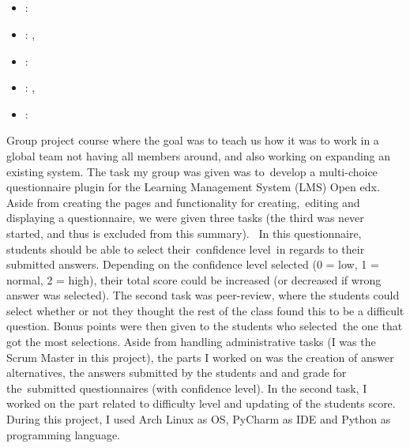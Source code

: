 \label{sec:section5}

\subsection[Global Software Development]{}
\label{sec:glob_soft_dev}
\begin{itemize} 
	\item {}: 
	\item {}: , 
	\item {}: 
	\item {}: , 
	\item {}: 
\end{itemize} 
Group project course where the goal was to teach us how it was to work in a global team not having all members around, and also working on expanding an existing system. 
The task my group was given was to develop a multi-choice questionnaire plugin for the Learning Management System (LMS) Open edx. 
\vspace{0.5em}\newline
Aside from creating the pages and functionality for creating, editing and displaying a questionnaire, we were given three tasks 
(the third was never started, and thus is excluded from this summary). 
In this questionnaire, students should be able to select their confidence level in regards to their submitted answers. 
Depending on the confidence level selected (0 = low, 1 = normal, 2 = high), their total score could be increased (or decreased if wrong answer was selected).
\vspace{0.5em}\newline
The second task was peer-review, where the students could select whether or not they thought the rest of the class found this to be a difficult question. 
Bonus points were then given to the students who selected the one that got the most selections.
\vspace{0.5em}\newline
Aside from handling administrative tasks (I was the Scrum Master in this project), the parts I worked on was the creation of answer alternatives, 
the answers submitted by the students and and grade for the submitted questionnaires (with confidence level). 
In the second task, I worked on the part related to difficulty level and updating of the students score.
During this project, I used Arch Linux as OS, PyCharm as IDE and Python as programming language.

